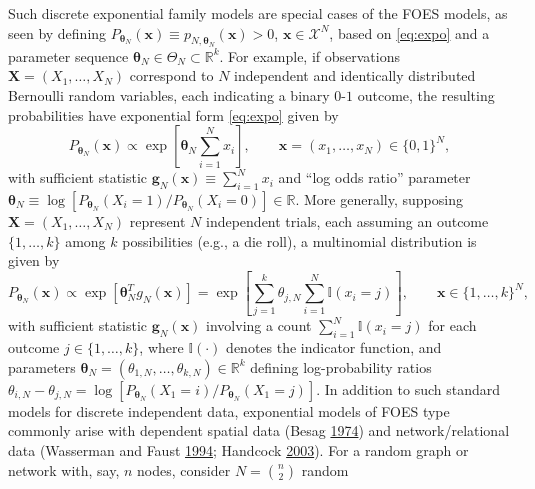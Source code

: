 \documentclass[12pt]{article}
\theoremstyle{definition}
\begin{document}
Such discrete exponential family models are special cases of the FOES
models, as seen by defining
\(P_{\boldsymbol \theta_N}(\boldsymbol x)\equiv p_{N,\boldsymbol \theta_N}(\boldsymbol x)> 0\),
\(\boldsymbol x \in \mathcal{X}^N\), based on \eqref{eq:expo} and a
parameter sequence
\(\boldsymbol \theta_N \in \Theta_N \subset \mathbb{R}^k\). For example,
if observations \(\boldsymbol X = (X_1,\ldots,X_N)\) correspond to \(N\)
independent and identically distributed Bernoulli random variables, each
indicating a binary \(0\)-\(1\) outcome, the resulting probabilities
have exponential form \eqref{eq:expo} given by
\begin{equation}
\label{eq:mod1}
P_{\boldsymbol \theta_N}(\boldsymbol x) \propto
 \exp\left[\boldsymbol \theta_N \sum_{i=1}^N x_i\right], \qquad \boldsymbol x=(x_1,\ldots,x_N) \in\{0,1\}^N, 
 \end{equation}
with sufficient statistic
\(\boldsymbol g_N(\boldsymbol x)\equiv \sum_{i=1}^N x_i\) and ``log odds
ratio'' parameter
\(\boldsymbol \theta_N \equiv \log[ P_{\boldsymbol \theta_N}(X_i=1)/P_{\boldsymbol \theta_N}(X_i=0) ] \in \mathbb{R}\).
More generally, supposing \(\boldsymbol X =(X_1,\ldots,X_N)\) represent
\(N\) independent trials, each assuming an outcome \(\{1,\ldots,k\}\)
among \(k\) possibilities (e.g., a die roll), a multinomial distribution
is given by
\begin{equation}
\label{eq:mod11}
P_{\boldsymbol \theta_N}(\boldsymbol x) \propto  \exp\left[  \boldsymbol \theta_{N}^T g_N(\boldsymbol x)   \right] =
\exp\left[ \sum_{j=1}^k {\theta_{j,N}} \sum_{i=1}^N \mathbb{I}(x_i=j) \right], \qquad \boldsymbol x  \in\{1,\ldots,k\}^N, 
\end{equation}
with sufficient statistic \(\boldsymbol g_N(\boldsymbol x)\) involving a
count \(\sum_{i=1}^N \mathbb{I}(x_i=j)\) for each outcome
\(j \in \{1,\ldots,k\}\), where \(\mathbb{I}(\cdot)\) denotes the
indicator function, and parameters
\(\boldsymbol \theta_N=(\theta_{1,N},\ldots,\theta_{k,N})\in\mathbb{R}^k\)
defining log-probability ratios
\(\theta_{i,N}-\theta_{j,N} =\log [P_{\boldsymbol \theta_N}(X_1=i)/P_{\boldsymbol \theta_N}(X_1=j)]\).
In addition to such standard models for discrete independent data,
exponential models of FOES type commonly arise with dependent spatial
data (Besag \protect\hyperlink{ref-besag1974spatial}{1974}) and
network/relational data (Wasserman and Faust
\protect\hyperlink{ref-wasserman1994social}{1994}; Handcock
\protect\hyperlink{ref-handcock2003assessing}{2003}). For a random graph
or network with, say, \(n\) nodes, consider \(N={n \choose 2}\) random
\end{document}
